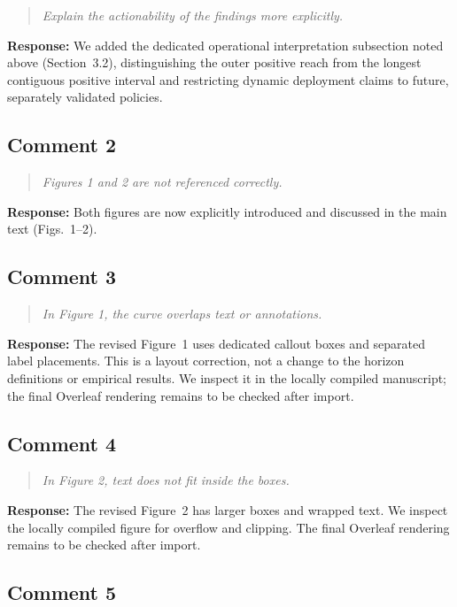 \documentclass[11pt,a4paper]{article}
\newenvironment{reviewcomment}
  {\begin{quote}\itshape}
  {\end{quote}}
\newcommand{\response}{\noindent\textbf{Response:} }
\begin{document}
\begin{reviewcomment}
Explain the actionability of the findings more explicitly.
\end{reviewcomment}

\response
We added the dedicated operational interpretation subsection noted above
(Section~3.2), distinguishing the outer positive reach from the longest
contiguous positive interval and restricting dynamic deployment claims to
future, separately validated policies.


\subsection*{Comment 2}

\begin{reviewcomment}
Figures 1 and 2 are not referenced correctly.
\end{reviewcomment}

\response
Both figures are now explicitly introduced and discussed in the main text
(Figs.~1--2).


\subsection*{Comment 3}

\begin{reviewcomment}
In Figure 1, the curve overlaps text or annotations.
\end{reviewcomment}

\response
The revised Figure~1 uses dedicated callout boxes and separated label
placements. This is a layout correction, not a change to the horizon
definitions or empirical results. We inspect it in the locally compiled
manuscript; the final Overleaf rendering remains to be checked after import.


\subsection*{Comment 4}

\begin{reviewcomment}
In Figure 2, text does not fit inside the boxes.
\end{reviewcomment}

\response
The revised Figure~2 has larger boxes and wrapped text. We inspect the
locally compiled figure for overflow and clipping. The final Overleaf
rendering remains to be checked after import.


\subsection*{Comment 5}
\end{document}
